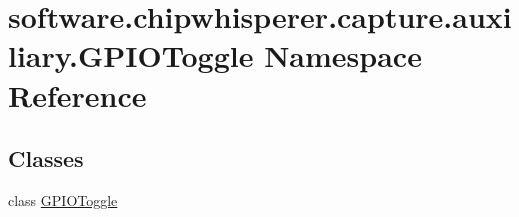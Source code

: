\hypertarget{namespacesoftware_1_1chipwhisperer_1_1capture_1_1auxiliary_1_1GPIOToggle}{}\section{software.\+chipwhisperer.\+capture.\+auxiliary.\+G\+P\+I\+O\+Toggle Namespace Reference}
\label{namespacesoftware_1_1chipwhisperer_1_1capture_1_1auxiliary_1_1GPIOToggle}
\subsection*{Classes}
\begin{DoxyCompactItemize}
\item 
class \hyperlink{classsoftware_1_1chipwhisperer_1_1capture_1_1auxiliary_1_1GPIOToggle_1_1GPIOToggle}{G\+P\+I\+O\+Toggle}
\end{DoxyCompactItemize}
